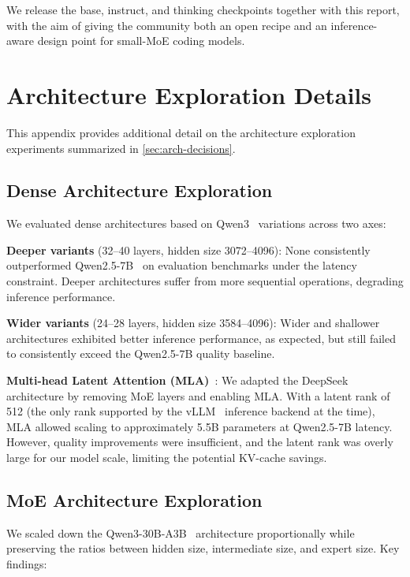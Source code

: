 \documentclass[11pt,a4paper]{article}
\begin{document}
We release the base, instruct, and thinking checkpoints together with
this report,
with the aim of giving the community both an open recipe and an
inference-aware design point for small-MoE coding models.


\newpage
\printbibliography[title={References}]

\appendix

\section{Architecture Exploration Details}
\label{app:arch-exploration}

This appendix provides additional detail on the architecture exploration
experiments summarized in \cref{sec:arch-decisions}.

\subsection{Dense Architecture Exploration}

We evaluated dense architectures based on Qwen3~\cite{yang2025qwen3} variations across two axes:

\textbf{Deeper variants} (32--40 layers, hidden size 3072--4096): None
consistently outperformed Qwen2.5-7B~\cite{qwen2.5} on evaluation benchmarks under the
latency constraint. Deeper architectures suffer from more sequential
operations, degrading inference performance.

\textbf{Wider variants} (24--28 layers, hidden size 3584--4096): Wider and
shallower architectures exhibited better inference performance, as expected,
but still failed to consistently exceed the Qwen2.5-7B quality baseline.

\textbf{Multi-head Latent Attention (MLA)}~\cite{deepseekai2024deepseekv2}: We adapted the DeepSeek
architecture by removing MoE layers and enabling MLA. With a latent rank of
512 (the only rank supported by the vLLM~\cite{kwon2023vllm} inference backend at the time), MLA
allowed scaling to approximately 5.5B parameters at Qwen2.5-7B latency.
However, quality improvements were insufficient, and the latent rank was
overly large for our model scale, limiting the potential KV-cache savings.

\subsection{MoE Architecture Exploration}

We scaled down the Qwen3-30B-A3B~\cite{yang2025qwen3} architecture proportionally while preserving
the ratios between hidden size, intermediate size, and expert size. Key
findings:
\end{document}
